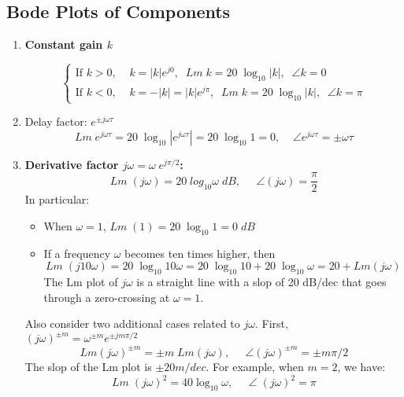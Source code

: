 \documentclass{article}
\begin{document}
\subsection*{Bode Plots of Components}

\begin{enumerate}
\item {\bf Constant gain $k$}

  \begin{equation} 
    \left\{ \begin{array}{l}
      \mbox{If $k>0, \;\;\;\;k=|k|e^{j0}, \;\;Lm\;k=20 \;\log_{10}|k|,\;\;\angle k=0$} \\
      \mbox{If $k<0, \;\;\;\;k=-|k|=|k|e^{j\pi}, \;\;Lm\;k=20\;\log_{10}|k|,\;\;\angle k=\pi$} 
    \end{array} \right. 
  \end{equation}

\item Delay factor: $e^{\pm j\omega \tau}$
  \begin{equation} 
    Lm \;e^{ j\omega \tau}=20\;\log_{10} |e^{ j\omega \tau}|=20\;\log_{10} 1=0,\;\;\;\;
    \angle e^{ j\omega \tau} =\pm \omega \tau 
  \end{equation}

\item {\bf Derivative factor $j\omega=\omega\; e^{j\pi/2}$:}
  \begin{equation} 
    Lm\; (j\omega)=20\; log_{10} \omega\;dB,\;\;\;\;\;\angle(j\omega)=\frac{\pi}{2}
  \end{equation}
  In particular:
  \begin{itemize}
  \item When $\omega=1$, $Lm \;(1) =20\; \log_{10} 1=0\;dB$
  \item If a frequency $\omega$ becomes ten times higher, then
    \begin{equation}
      Lm\; (j10\omega)=20\; \log_{10} 10\omega=20 \;\log_{10} 10+20\;\log_{10}\omega 
      =20+Lm(j\omega) 
    \end{equation}
    The Lm plot of $j\omega$ is a straight line with a slop of 20 dB/dec that goes
    through a zero-crossing at $\omega=1$.

  \end{itemize}

  Also consider two additional cases related to $j\omega$. First, 
  $(j\omega)^{\pm m}=\omega^{\pm m} e^{\pm j m\pi/2}$
  \begin{equation}
    Lm(j\omega)^{\pm m}=\pm m\;Lm(j\omega),\;\;\;\;\;\angle(j\omega)^{\pm m}=\pm m\pi/2
  \end{equation}
  The slop of the Lm plot is $\pm 20m/dec$. For example, when $m=2$, we have:
  \begin{equation}
    Lm\; (j\omega)^2=40\log_{10}\omega,\;\;\;\;\;\angle\;(j\omega)^2=\pi 
  \end{equation}


\end{enumerate}
\end{document}
